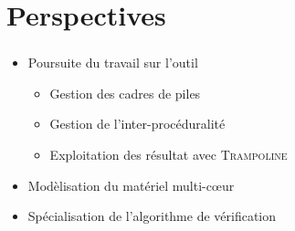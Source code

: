\documentclass{beamer}
\begin{document}
  \section{Perspectives}
  \begin{frame}
    \frametitle{\secname}

    \vfill
    \begin{itemize}
      \item Poursuite du travail sur l'outil
        \begin{itemize}
          \item Gestion des cadres de piles
          \item Gestion de l'inter-procéduralité
          \item Exploitation des résultat avec \textsc{Trampoline}
        \end{itemize}
    \end{itemize}

    \vfill
    \begin{itemize}
      \item Modèlisation du matériel multi-c{\oe}ur
      \item Spécialisation de l'algorithme de vérification
    \end{itemize}
    
    \vfill
  \end{frame}
\end{document}
